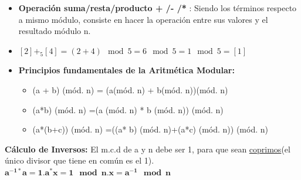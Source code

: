 \documentclass[12pt, twoside, openright]{report} %
\begin{document}
  \begin{itemize}
  \item \textbf{Operación suma/resta/producto + /- /*} : Siendo los términos
    respecto a mismo módulo, consiste en hacer la operación entre sus
    valores y el resultado módulo n.
    
  \item $[2]+_5[4]=(2+4) \mod 5 = 6 \mod 5 = 1 \mod 5 = [1]$
  \item \textbf{Principios fundamentales de la Aritmética Modular:}
    

    \begin{itemize}
    \item (a + b) (mód. n) = (a(mód. n) + b(mód. n))(mód. n)
      
    \item (a*b) (mód. n) =(a (mód. n) * b (mód. n)) (mód. n)
      
    \item (a*(b+c)) (mód. n) =((a* b) (mód. n)+(a*c) (mód. n)) (mód. n)
      
    \end{itemize}
  \end{itemize}

  
  \textbf{Cálculo de Inversos:} El m.c.d de a y n debe ser 1, para que
  sean \underline{coprimos}(el único divisor que tiene en común es el
  1). $\boldsymbol{a^{-1*} a=1. a^*x=1 \mod n. x=a^{-1} \mod n}$
  
\end{document}
